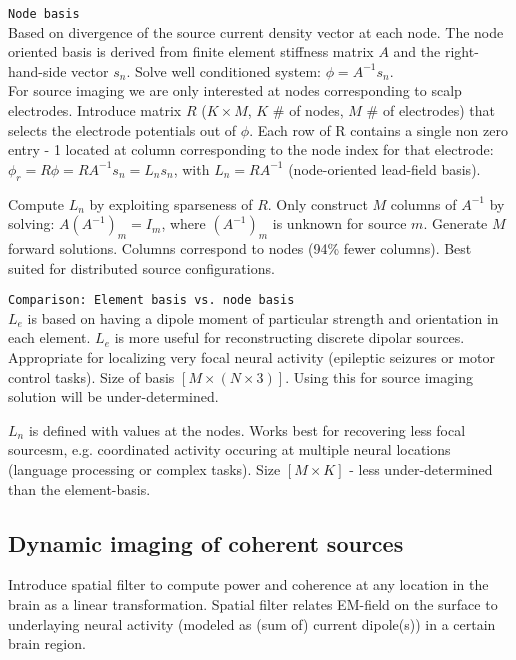 \verb!Node basis!\\
Based on divergence of the source current density vector at each node. The node oriented basis is derived from finite element stiffness matrix $A$ and the right-hand-side vector $s_n$. Solve well conditioned system: $\phi=A^{-1}s_n$.\\
For source imaging we are only interested at nodes corresponding to scalp electrodes. Introduce matrix $R$ ($K\times M$, $K$ \# of nodes, $M$ \# of electrodes) that selects the electrode potentials out of $\phi$. Each row of R contains a single non zero entry - 1 located at column corresponding to the node index for that electrode: $\phi_r = R\phi = RA^{-1}s_n = L_ns_n$, with $L_n = RA^{-1}$ (node-oriented lead-field basis).\vs

Compute $L_n$ by exploiting sparseness of $R$. Only construct $M$ columns of $A^{-1}$ by solving: $A(A^{-1})_m = I_m$, where $(A^{-1})_m$ is unknown for source $m$. Generate $M$ forward solutions.\vs
Columns correspond to nodes (94\% fewer columns). Best suited for distributed source configurations.\vs

\verb!Comparison: Element basis vs. node basis!\\
$L_e$ is based on having a dipole moment of particular strength and orientation in each element. $L_e$ is more useful for reconstructing discrete dipolar sources. Appropriate for localizing very focal neural activity (epileptic seizures or motor control tasks). Size of basis $[M\times(N\times 3)]$. Using this for source imaging \arr solution will be under-determined. \vs\vs

$L_n$ is defined with values at the nodes. Works best for recovering less focal sourcesm, e.g. coordinated activity occuring at multiple neural locations (language processing or complex tasks). Size $[M\times K]$ - less under-determined than the element-basis.

\subsection{Dynamic imaging of coherent sources}
Introduce spatial filter to compute power and coherence at any location in the brain as a linear transformation. Spatial filter relates EM-field on the surface to underlaying neural activity (modeled as (sum of) current dipole(s)) in a certain brain region.\\

